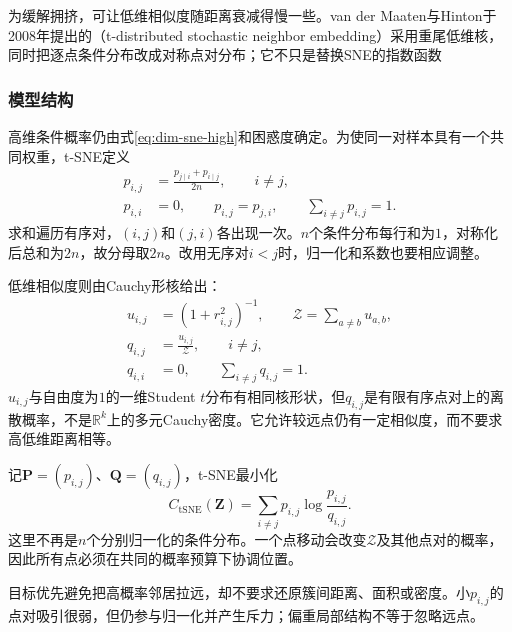 为缓解拥挤，可让低维相似度随距离衰减得慢一些。van der Maaten与Hinton于2008年提出的（t-distributed stochastic neighbor embedding）采用重尾低维核，同时把逐点条件分布改成对称点对分布；它不只是替换SNE的指数函数

\subsubsection{模型结构}

高维条件概率仍由式\eqref{eq:dim-sne-high}和困惑度确定。为使同一对样本具有一个共同权重，t-SNE定义
\begin{equation}
  \label{eq:dim-tsne-joint}
  \begin{aligned}
    p_{i,j}&=\frac{p_{j\mid i}+p_{i\mid j}}{2n},\qquad i\ne j,\\
    p_{i,i}&=0,\qquad p_{i,j}=p_{j,i},\qquad
      \sum_{i\ne j}p_{i,j}=1.
  \end{aligned}
\end{equation}
求和遍历有序对，$(i,j)$和$(j,i)$各出现一次。$n$个条件分布每行和为$1$，对称化后总和为$2n$，故分母取$2n$。改用无序对$i<j$时，归一化和系数也要相应调整。

低维相似度则由Cauchy形核给出：
\begin{equation}
  \label{eq:dim-tsne-low}
  \begin{aligned}
    u_{i,j}&=(1+r_{i,j}^2)^{-1},\qquad
      \mathcal{Z}=\sum_{a\ne b}u_{a,b},\\
    q_{i,j}&=\frac{u_{i,j}}{\mathcal{Z}},\qquad i\ne j,\\
    q_{i,i}&=0,\qquad \sum_{i\ne j}q_{i,j}=1.
  \end{aligned}
\end{equation}
$u_{i,j}$与自由度为$1$的一维Student $t$分布有相同核形状，但$q_{i,j}$是有限有序点对上的离散概率，不是$\mathbb{R}^k$上的多元Cauchy密度。它允许较远点仍有一定相似度，而不要求高低维距离相等。

记$\bm{P}=(p_{i,j})$、$\bm{Q}=(q_{i,j})$，t-SNE最小化
\begin{equation}
  \label{eq:dim-tsne-loss}
  C_{\mathrm{tSNE}}(\bm{Z})
    =\sum_{i\ne j}p_{i,j}\log\frac{p_{i,j}}{q_{i,j}}.
\end{equation}
这里不再是$n$个分别归一化的条件分布。一个点移动会改变$\mathcal{Z}$及其他点对的概率，因此所有点必须在共同的概率预算下协调位置。

目标优先避免把高概率邻居拉远，却不要求还原簇间距离、面积或密度。小$p_{i,j}$的点对吸引很弱，但仍参与归一化并产生斥力；偏重局部结构不等于忽略远点。


